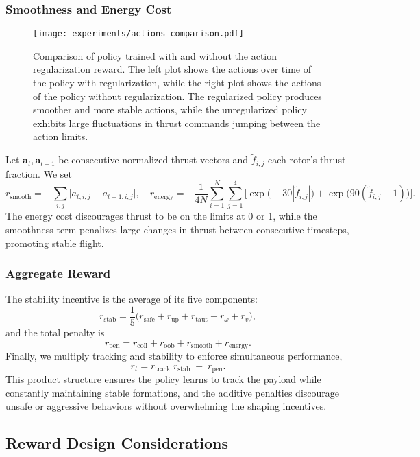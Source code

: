 \subsubsection{Smoothness and Energy Cost}
\begin{figure}[ht]
    \centering
    
    \texttt{[image: experiments/actions\_comparison.pdf]}
    \caption[Policy comparison with/without action regularization]{Comparison of policy trained with and without the action regularization reward. The left plot shows the actions over time of the policy with regularization, while the right plot shows the actions of the policy without regularization. The regularized policy produces smoother and more stable actions, while the unregularized policy exhibits large fluctuations in thrust commands jumping between the action limits.}
    \label{fig:}
\end{figure}
Let \(\mathbf{a}_t,\mathbf{a}_{t-1}\) be consecutive normalized thrust vectors and \(\tilde f_{i,j}\) each rotor's thrust fraction.  We set
\[
r_{\mathrm{smooth}}
= -\sum_{i,j} \bigl|a_{t,i,j}-a_{t-1,i,j}\bigr|,
\quad
r_{\mathrm{energy}}
= -\frac{1}{4N}\sum_{i=1}^N\sum_{j=1}^4\bigl[\exp\bigl(-30|\tilde f_{i,j}|\bigr)+\exp\bigl(90(\tilde f_{i,j}-1)\bigr)\bigr].
\]
The energy cost discourages thrust to be on the limits at 0 or 1, while the smoothness term penalizes large changes in thrust between consecutive timesteps, promoting stable flight.
\subsubsection{Aggregate Reward}
The stability incentive is the average of its five components:
\[
r_{\mathrm{stab}}
= \frac{1}{5}\bigl(r_{\mathrm{safe}} + r_{\mathrm{up}} + r_{\mathrm{taut}} + r_{\omega} + r_{v}\bigr),
\]
and the total penalty is
\[
r_{\mathrm{pen}}
= r_{\mathrm{coll}} + r_{\mathrm{oob}} + r_{\mathrm{smooth}} + r_{\mathrm{energy}}.
\]
Finally, we multiply tracking and stability to enforce simultaneous performance,
\[
r_t
= r_{\mathrm{track}}\;r_{\mathrm{stab}}
\;+\;r_{\mathrm{pen}}.
\]
This product structure ensures the policy learns to track the payload while constantly maintaining stable formations, and the additive penalties discourage unsafe or aggressive behaviors without overwhelming the shaping incentives.

\subsection{Reward Design Considerations}
